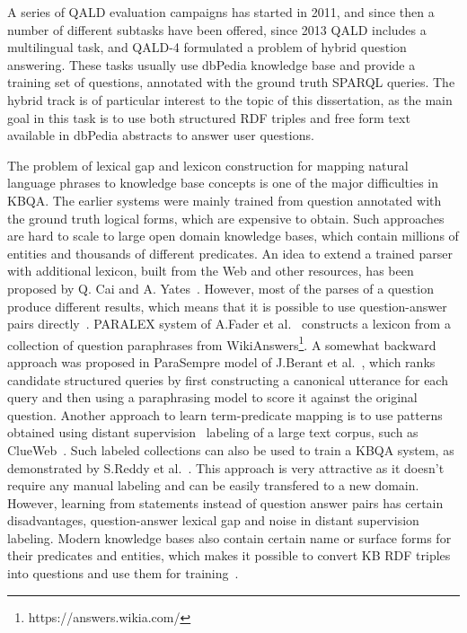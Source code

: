 A series of QALD evaluation campaigns has started in 2011, and since then a number of different subtasks have been offered, \ie since 2013 QALD includes a multilingual task, and QALD-4 formulated a problem of hybrid question answering.
These tasks usually use dbPedia knowledge base and provide a training set of questions, annotated with the ground truth SPARQL queries.
The hybrid track is of particular interest to the topic of this dissertation, as the main goal in this task is to use both structured RDF triples and free form text available in dbPedia abstracts to answer user questions.

The problem of lexical gap and lexicon construction for mapping natural language phrases to knowledge base concepts is one of the major difficulties in KBQA.
The earlier systems were mainly trained from question annotated with the ground truth logical forms, which are expensive to obtain.
Such approaches are hard to scale to large open domain knowledge bases, which contain millions of entities and thousands of different predicates.
An idea to extend a trained parser with additional lexicon, built from the Web and other resources, has been proposed by Q. Cai and A. Yates~\cite{CaiY13}.
However, most of the parses of a question produce different results, which means that it is possible to use question-answer pairs directly~\cite{BerantCFL13:sempre}.
PARALEX system of A.Fader et al.~\cite{fader2013paraphrase} constructs a lexicon from a collection of question paraphrases from WikiAnswers\footnote{https://answers.wikia.com/}.
A somewhat backward approach was proposed in ParaSempre model of J.Berant et al.~\cite{BerantL14:parasempre}, which ranks candidate structured queries by first constructing a canonical utterance for each query and then using a paraphrasing model to score it against the original question.
Another approach to learn term-predicate mapping is to use patterns obtained using distant supervision~\cite{MintzBSJ09} labeling of a large text corpus, such as ClueWeb~\cite{yao2014freebase}.
Such labeled collections can also be used to train a KBQA system, as demonstrated by S.Reddy et al.~\cite{ReddyLS14}.
This approach is very attractive as it doesn't require any manual labeling and can be easily transfered to a new domain.
However, learning from statements instead of question answer pairs has certain disadvantages, \eg question-answer lexical gap and noise in distant supervision labeling.
Modern knowledge bases also contain certain name or surface forms for their predicates and entities, which makes it possible to convert KB RDF triples into questions and use them for training~\cite{BordesCW14:emnlp}.
